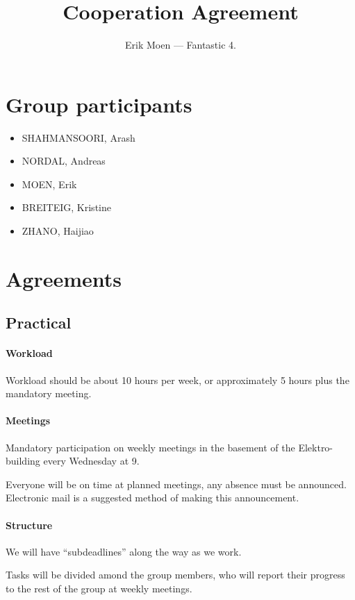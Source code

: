 \documentclass[a4paper, oneside, fleqn]{scrartcl}
\begin{document}
\title{Cooperation Agreement}
\subject{Homo Mobilis — Eksperter i Team}
\author{Erik Moen — Fantastic 4.}
\maketitle
\section*{Group participants}
\begin{itemize}
  \item SHAHMANSOORI, Arash
  \item NORDAL, Andreas
  \item MOEN, Erik
  \item BREITEIG, Kristine
  \item ZHANO, Haijiao
\end{itemize}

\section*{Agreements}

\subsection*{Practical}
\paragraph{Workload}
Workload should be about 10 hours per week, or approximately 5 hours plus the mandatory meeting.

\paragraph{Meetings}
Mandatory participation on weekly meetings in the basement of the Elektro-building every Wednesday at 9.

Everyone will be on time at planned meetings, any absence must be announced. Electronic mail is a suggested method of making this announcement.

\paragraph{Structure}
We will have ``subdeadlines'' along the way as we work.

Tasks will be divided amond the group members, who will report their progress to the rest of the group at weekly meetings.
\end{document}
